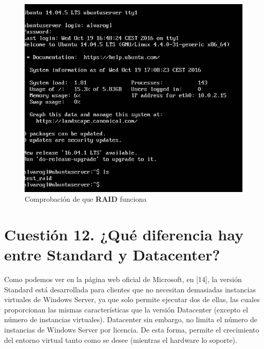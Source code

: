 \begin{figure}[H] %
\centering
\includegraphics[scale=0.8]{cuestionopc1-comprobacionraidcorrecta.PNG}  %
\caption{Comprobación de que \textbf{RAID} funciona} \label{fig:figura1}
\end{figure}



\section{Cuestión 12. ¿Qué diferencia hay entre Standard y Datacenter?}

Como podemos ver en la página web oficial de Microsoft, en [14], la versión Standard está desarrollada para clientes que no necesitan demasiadas instancias virtuales de Windows Server, ya que solo permite ejecutar dos de ellas, las cuales proporcionan las mismas características que la versión Datacenter (excepto el número de instancias virtuales).
Datacenter sin embargo, no limita el número de instancias de Windows Server por licencia. De esta forma, permite el crecimiento del entorno virtual tanto como se desee (mientras el hardware lo soporte).

